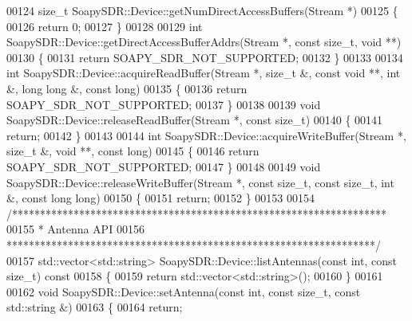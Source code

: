\begin{DoxyCode}
00124 \textcolor{keywordtype}{size\_t} SoapySDR::Device::getNumDirectAccessBuffers(Stream *)
00125 \{
00126     \textcolor{keywordflow}{return} 0;
00127 \}
00128 
00129 \textcolor{keywordtype}{int} SoapySDR::Device::getDirectAccessBufferAddrs(Stream *, \textcolor{keyword}{const} \textcolor{keywordtype}{size\_t}, \textcolor{keywordtype}{void} **)
00130 \{
00131     \textcolor{keywordflow}{return} SOAPY_SDR_NOT_SUPPORTED;
00132 \}
00133 
00134 \textcolor{keywordtype}{int} SoapySDR::Device::acquireReadBuffer(Stream *, \textcolor{keywordtype}{size\_t} &, \textcolor{keyword}{const} \textcolor{keywordtype}{void} **, \textcolor{keywordtype}{int} &, \textcolor{keywordtype}{long} \textcolor{keywordtype}{long} &, \textcolor{keyword}{const} \textcolor{keywordtype}{long})
00135 \{
00136     \textcolor{keywordflow}{return} SOAPY_SDR_NOT_SUPPORTED;
00137 \}
00138 
00139 \textcolor{keywordtype}{void} SoapySDR::Device::releaseReadBuffer(Stream *, \textcolor{keyword}{const} \textcolor{keywordtype}{size\_t})
00140 \{
00141     \textcolor{keywordflow}{return};
00142 \}
00143 
00144 \textcolor{keywordtype}{int} SoapySDR::Device::acquireWriteBuffer(Stream *, \textcolor{keywordtype}{size\_t} &, \textcolor{keywordtype}{void} **, \textcolor{keyword}{const} \textcolor{keywordtype}{long})
00145 \{
00146     \textcolor{keywordflow}{return} SOAPY_SDR_NOT_SUPPORTED;
00147 \}
00148 
00149 \textcolor{keywordtype}{void} SoapySDR::Device::releaseWriteBuffer(Stream *, \textcolor{keyword}{const} \textcolor{keywordtype}{size\_t}, \textcolor{keyword}{const} \textcolor{keywordtype}{size\_t}, \textcolor{keywordtype}{int} &, \textcolor{keyword}{const} \textcolor{keywordtype}{long} \textcolor{keywordtype}{long})
00150 \{
00151     \textcolor{keywordflow}{return};
00152 \}
00153 
00154 \textcolor{comment}{/*******************************************************************}
00155 \textcolor{comment}{ * Antenna API}
00156 \textcolor{comment}{ ******************************************************************/}
00157 std::vector<std::string> SoapySDR::Device::listAntennas(\textcolor{keyword}{const} \textcolor{keywordtype}{int}, \textcolor{keyword}{const} \textcolor{keywordtype}{size\_t})\textcolor{keyword}{ const}
00158 \textcolor{keyword}{}\{
00159     \textcolor{keywordflow}{return} std::vector<std::string>();
00160 \}
00161 
00162 \textcolor{keywordtype}{void} SoapySDR::Device::setAntenna(\textcolor{keyword}{const} \textcolor{keywordtype}{int}, \textcolor{keyword}{const} \textcolor{keywordtype}{size\_t}, \textcolor{keyword}{const} std::string &)
00163 \{
00164     \textcolor{keywordflow}{return};

\end{DoxyCode}
